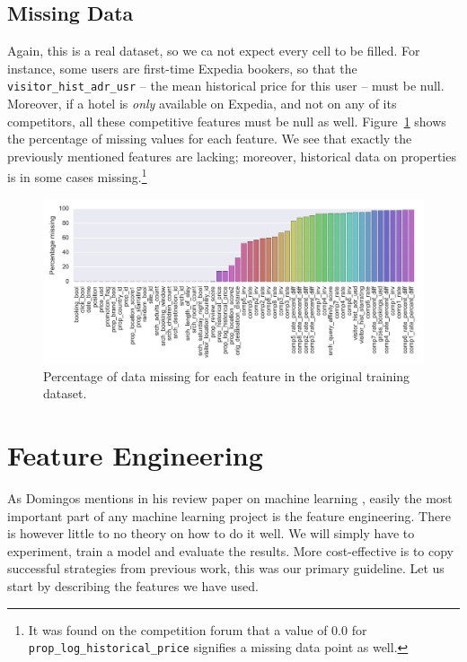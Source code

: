 \documentclass[runningheads,a4paper]{llncs}
\begin{document}
\subsection{Missing Data}
Again, this is a real dataset, so we ca not expect every cell to be filled. For instance, some users are first-time Expedia bookers, so that the \verb|visitor_hist_adr_usr| -- the mean historical price for this user -- must be null. Moreover, if a hotel is \emph{only} available on Expedia, and not on any of its competitors, all these competitive features must be null as well. Figure~\ref{fig:barplot} shows the percentage of missing values for each feature. We see that exactly the previously mentioned features are lacking; moreover, historical data on properties is in some cases missing.\footnote{It was found on the competition forum \cite{kaggle:forums} that a value of $0.0$ for \texttt{prop\_log\_historical\_price} signifies a missing data point as well.}

\begin{figure}[h]
	\includegraphics[width=\linewidth]{Pictures/barplot.png}
    \caption{Percentage of data missing for each feature in the original training dataset.}
    \label{fig:barplot}
\end{figure}

\section{Feature Engineering}

As Domingos mentions in his review paper on machine learning \cite{domingos}, easily the most important part of any machine learning project is the feature engineering. There is however little to no theory on how to do it well. We will simply have to experiment, train a model and evaluate the results. More cost-effective is to copy successful strategies from previous work, this was our primary guideline. Let us start by describing the features we have used.
\end{document}
